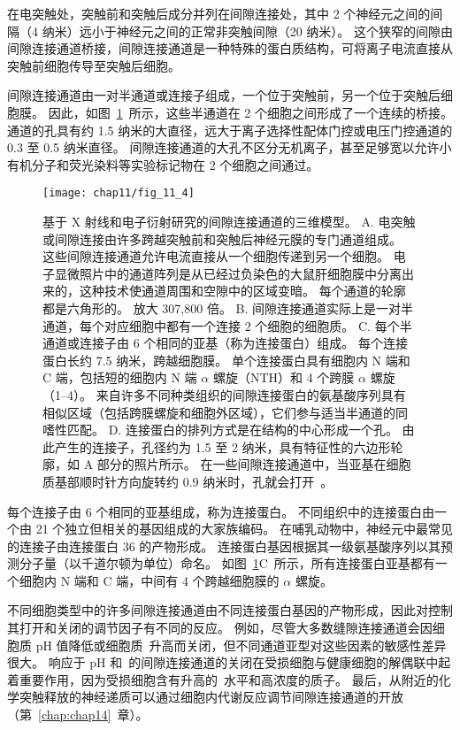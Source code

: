 在电突触处，突触前和突触后成分并列在间隙连接处，其中 2 个神经元之间的间隔（4 纳米）远小于神经元之间的正常非突触间隙（20 纳米）。
这个狭窄的间隙由间隙连接通道桥接，间隙连接通道是一种特殊的蛋白质结构，可将离子电流直接从突触前细胞传导至突触后细胞。


间隙连接通道由一对半通道或连接子组成，一个位于突触前，另一个位于突触后细胞膜。
因此，如图~\ref{fig:11_4}~所示，这些半通道在 2 个细胞之间形成了一个连续的桥接。
通道的孔具有约 1.5 纳米的大直径，远大于离子选择性配体门控或电压门控通道的 0.3 至 0.5 纳米直径。
间隙连接通道的大孔不区分无机离子，甚至足够宽以允许小有机分子和荧光染料等实验标记物在 2 个细胞之间通过。


\begin{figure}[htbp]
	\centering
	\texttt{[image: chap11/fig\_11\_4]}
	\caption{基于 X 射线和电子衍射研究的间隙连接通道的三维模型。
		A. 电突触或间隙连接由许多跨越突触前和突触后神经元膜的专门通道组成。
		这些间隙连接通道允许电流直接从一个细胞传递到另一个细胞。
		电子显微照片中的通道阵列是从已经过负染色的大鼠肝细胞膜中分离出来的，这种技术使通道周围和空隙中的区域变暗。
		每个通道的轮廓都是六角形的。
		放大 307,800 倍。
		B. 间隙连接通道实际上是一对半通道，每个对应细胞中都有一个连接 2 个细胞的细胞质\cite{makowski1977gap}。
		C. 每个半通道或连接子由 6 个相同的亚基（称为连接蛋白）组成。
		每个连接蛋白长约 7.5 纳米，跨越细胞膜。
		单个连接蛋白具有细胞内 N 端和 C 端，包括短的细胞内 N 端 $\alpha$ 螺旋（NTH）和 4 个跨膜 $\alpha$ 螺旋（1–4）。
		来自许多不同种类组织的间隙连接蛋白的氨基酸序列具有相似区域（包括跨膜螺旋和细胞外区域），它们参与适当半通道的同嗜性匹配。
		D. 连接蛋白的排列方式是在结构的中心形成一个孔。
		由此产生的连接子，孔径约为 1.5 至 2 纳米，具有特征性的六边形轮廓，如 A 部分的照片所示。
		在一些间隙连接通道中，当亚基在细胞质基部顺时针方向旋转约 0.9 纳米时，孔就会打开~\cite{unwin1980structure}。}
	\label{fig:11_4}
\end{figure}


每个连接子由 6 个相同的亚基组成，称为连接蛋白。
不同组织中的连接蛋白由一个由 21 个独立但相关的基因组成的大家族编码。
在哺乳动物中，神经元中最常见的连接子由连接蛋白 36 的产物形成。
连接蛋白基因根据其一级氨基酸序列以其预测分子量（以千道尔顿为单位）命名。
如图~\ref{fig:11_4}C~所示，所有连接蛋白亚基都有一个细胞内 N 端和 C 端，中间有 4 个跨越细胞膜的 $\alpha$ 螺旋。


不同细胞类型中的许多间隙连接通道由不同连接蛋白基因的产物形成，因此对控制其打开和关闭的调节因子有不同的反应。
例如，尽管大多数缝隙连接通道会因细胞质 pH 值降低或细胞质~升高而关闭，但不同通道亚型对这些因素的敏感性差异很大。
响应于 pH 和~的间隙连接通道的关闭在受损细胞与健康细胞的解偶联中起着重要作用，因为受损细胞含有升高的~水平和高浓度的质子。
最后，从附近的化学突触释放的神经递质可以通过细胞内代谢反应调节间隙连接通道的开放（第~\ref{chap:chap14}~章）。


